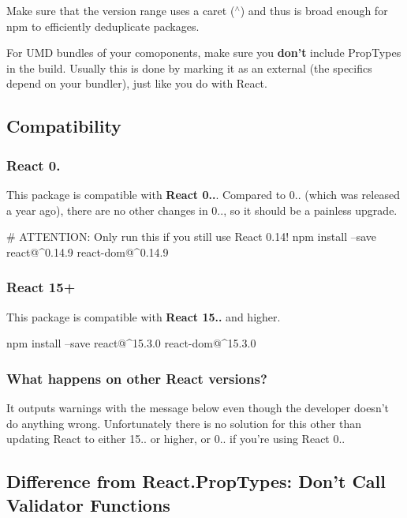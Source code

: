 Make sure that the version range uses a caret ({\ttfamily $^\wedge$}) and thus is broad enough for npm to efficiently deduplicate packages.

For U\+MD bundles of your comoponents, make sure you {\bfseries don’t} include {\ttfamily Prop\+Types} in the build. Usually this is done by marking it as an external (the specifics depend on your bundler), just like you do with React.

\subsection*{Compatibility}

\subsubsection*{React 0.}

This package is compatible with {\bfseries React 0..}. Compared to 0.. (which was released a year ago), there are no other changes in 0.., so it should be a painless upgrade.


\begin{DoxyCode}
# ATTENTION: Only run this if you still use React 0.14!
npm install --save react@^0.14.9 react-dom@^0.14.9
\end{DoxyCode}


\subsubsection*{React 15+}

This package is compatible with {\bfseries React 15..} and higher.


\begin{DoxyCode}
npm install --save react@^15.3.0 react-dom@^15.3.0
\end{DoxyCode}


\subsubsection*{What happens on other React versions?}

It outputs warnings with the message below even though the developer doesn’t do anything wrong. Unfortunately there is no solution for this other than updating React to either 15.. or higher, or 0.. if you’re using React 0..

\subsection*{Difference from {\ttfamily React.\+Prop\+Types}\+: Don’t Call Validator Functions}

